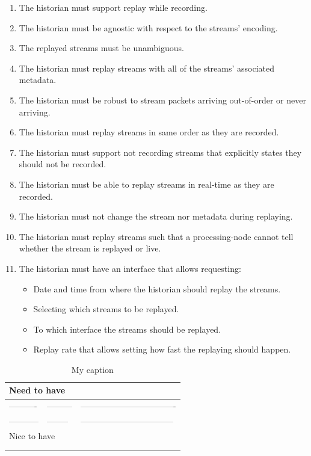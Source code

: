  
 \begin{enumerate}
	\item The historian must support replay while recording.
	\item The historian must be agnostic with respect to the streams' encoding.
	\item The replayed streams must be unambiguous.
	\item The historian must replay streams with all of the streams' associated metadata.
	\item The historian must be robust to stream packets arriving out-of-order or never arriving.
	\item The historian must replay streams in same order as they are recorded.
	\item The historian must support not recording streams that explicitly states they should not be recorded.
	\item The historian must be able to replay streams in real-time as they are recorded.
	\item The historian must not change the stream nor metadata during replaying.
	\item The historian must replay streams such that a processing-node cannot tell whether the stream is replayed or live.
	\item The historian must have an interface that allows requesting:
	\begin{itemize}
		\item Date and time from where the historian should replay the streams.
		\item Selecting which streams to be replayed.
		\item To which interface the streams should be replayed. 
		\item Replay rate that allows setting how fast the replaying should happen. 
	\end{itemize}
\end{enumerate}


\begin{table}[]
\centering
\caption{My caption}
\label{sec:analysis:historian:tablefeatures}
\begin{tabular}{l|l|l}

\multicolumn{3}{l}{Need to have}              \\ \hline
----------  & --------- & ---------------------------------- \\ \hline
----------- & --------  & --------------------------------- \\ \hline
\multicolumn{3}{l}{Nice to have}              \\ \hline
            &           &                       \\ \hline
            &           &                       \\ \hline
\end{tabular}
\end{table}

